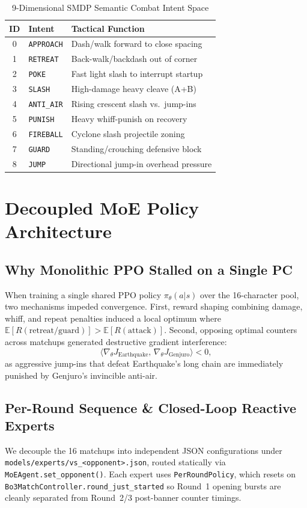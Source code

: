 \documentclass[10pt,twocolumn]{article}
\begin{document}
\begin{table}[t]
\centering
\caption{9-Dimensional SMDP Semantic Combat Intent Space}
\label{tab:intents}
\small
\begin{tabular}{c l l}
\hline
\textbf{ID} & \textbf{Intent} & \textbf{Tactical Function} \\
\hline
0 & \texttt{APPROACH} & Dash/walk forward to close spacing \\
1 & \texttt{RETREAT}  & Back-walk/backdash out of corner \\
2 & \texttt{POKE}     & Fast light slash to interrupt startup \\
3 & \texttt{SLASH}    & High-damage heavy cleave (A+B) \\
4 & \texttt{ANTI\_AIR} & Rising crescent slash vs.\ jump-ins \\
5 & \texttt{PUNISH}   & Heavy whiff-punish on recovery \\
6 & \texttt{FIREBALL} & Cyclone slash projectile zoning \\
7 & \texttt{GUARD}    & Standing/crouching defensive block \\
8 & \texttt{JUMP}     & Directional jump-in overhead pressure \\
\hline
\end{tabular}
\end{table}

\section{Decoupled MoE Policy Architecture}
\subsection{Why Monolithic PPO Stalled on a Single PC}
When training a single shared PPO policy $\pi_\theta(a|s)$ over the 16-character pool, two mechanisms impeded convergence. First, reward shaping combining damage, whiff, and repeat penalties induced a local optimum where $\mathbb{E}[R(\text{retreat/guard})] > \mathbb{E}[R(\text{attack})]$. Second, opposing optimal counters across matchups generated destructive gradient interference:
\begin{equation}
\langle \nabla_\theta J_{\text{Earthquake}},\, \nabla_\theta J_{\text{Genjuro}} \rangle < 0,
\end{equation}
as aggressive jump-ins that defeat Earthquake's long chain are immediately punished by Genjuro's invincible anti-air.

\subsection{Per-Round Sequence \& Closed-Loop Reactive Experts}
We decouple the 16 matchups into independent JSON configurations under \texttt{models/experts/vs\_<opponent>.json}, routed statically via \texttt{MoEAgent.set\_opponent()}. Each expert uses \texttt{PerRoundPolicy}, which resets on \texttt{Bo3MatchController.round\_just\_started} so Round~1 opening bursts are cleanly separated from Round~2/3 post-banner counter timings.
\end{document}

